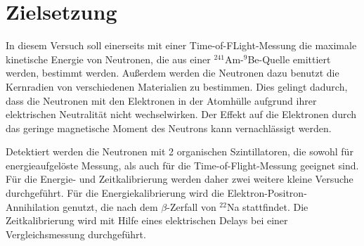 \section{Zielsetzung}

In diesem Versuch soll einerseits mit einer Time-of-FLight-Messung die maximale kinetische Energie von Neutronen, die aus einer $^{241}$Am-$^9$Be-Quelle emittiert werden, bestimmt werden. Außerdem werden die Neutronen dazu benutzt die Kernradien von verschiedenen Materialien zu bestimmen. Dies gelingt dadurch, dass die Neutronen mit den Elektronen in der Atomhülle aufgrund ihrer elektrischen Neutralität nicht wechselwirken. Der Effekt auf die Elektronen durch das geringe magnetische Moment des Neutrons kann vernachlässigt werden. 

Detektiert werden die Neutronen mit 2 organischen Szintillatoren, die sowohl für energieaufgelöste Messung, als auch für die Time-of-Flight-Messung geeignet sind. Für die Energie- und Zeitkalibrierung werden daher zwei weitere kleine Versuche durchgeführt. Für die Energiekalibrierung wird die Elektron-Positron-Annihilation genutzt, die nach dem $\beta$-Zerfall von $^{22}$Na stattfindet. Die Zeitkalibrierung wird mit Hilfe eines elektrischen Delays bei einer Vergleichsmessung durchgeführt.
